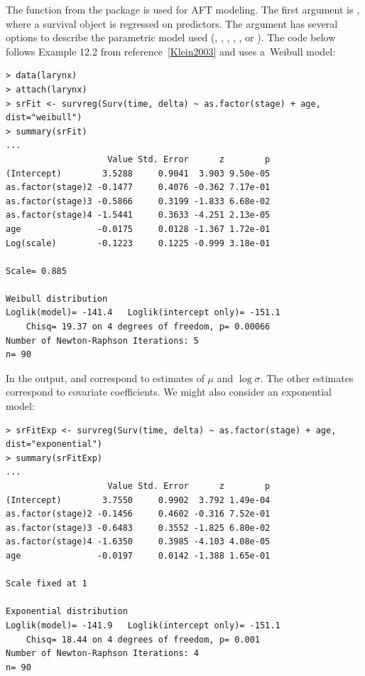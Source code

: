 \documentclass[11pt]{article}
\begin{document}
The  function from the  package is used for AFT modeling. The first argument is , where a survival object is regressed on predictors. The argument  has several options to describe the parametric model used (, , , , , or ). The code below follows Example 12.2 from reference~\ref{Klein2003} and uses a~Weibull model:
{\color{verbatimrcom}\begin{verbatim}
> data(larynx)
> attach(larynx)
> srFit <- survreg(Surv(time, delta) ~ as.factor(stage) + age, dist="weibull")
> summary(srFit)
...
                    Value Std. Error      z        p
(Intercept)        3.5288     0.9041  3.903 9.50e-05
as.factor(stage)2 -0.1477     0.4076 -0.362 7.17e-01
as.factor(stage)3 -0.5866     0.3199 -1.833 6.68e-02
as.factor(stage)4 -1.5441     0.3633 -4.251 2.13e-05
age               -0.0175     0.0128 -1.367 1.72e-01
Log(scale)        -0.1223     0.1225 -0.999 3.18e-01

Scale= 0.885 

Weibull distribution
Loglik(model)= -141.4   Loglik(intercept only)= -151.1
	Chisq= 19.37 on 4 degrees of freedom, p= 0.00066 
Number of Newton-Raphson Iterations: 5 
n= 90 
\end{verbatim}}
In the output,  and  correspond to estimates of $\mu$ and $\log\sigma$. The other estimates correspond to covariate coefficients. We might also consider an exponential model:
{\color{verbatimrcom}\begin{verbatim}
> srFitExp <- survreg(Surv(time, delta) ~ as.factor(stage) + age, dist="exponential")
> summary(srFitExp)
...
                    Value Std. Error      z        p
(Intercept)        3.7550     0.9902  3.792 1.49e-04
as.factor(stage)2 -0.1456     0.4602 -0.316 7.52e-01
as.factor(stage)3 -0.6483     0.3552 -1.825 6.80e-02
as.factor(stage)4 -1.6350     0.3985 -4.103 4.08e-05
age               -0.0197     0.0142 -1.388 1.65e-01

Scale fixed at 1 

Exponential distribution
Loglik(model)= -141.9   Loglik(intercept only)= -151.1
	Chisq= 18.44 on 4 degrees of freedom, p= 0.001 
Number of Newton-Raphson Iterations: 4 
n= 90 
\end{verbatim}}
\end{document}
